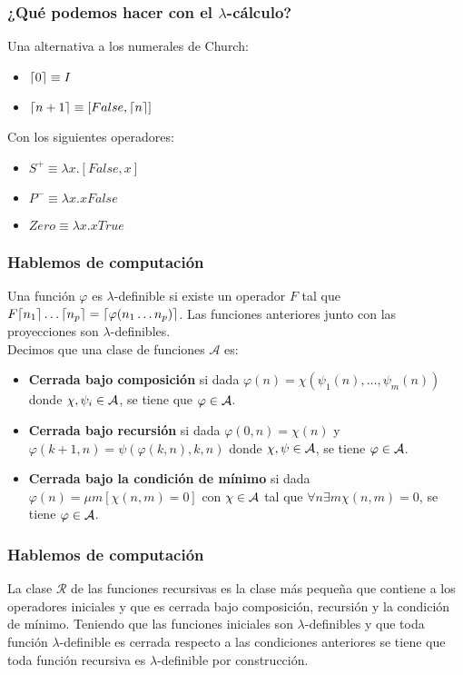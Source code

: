 \documentclass[spanish, a4paper, 12pt, final, slideColor, nototal, colorBG, pdf, noaccumulate, darkblue] {beamer}
\DeclarePairedDelimiter{\ceil}{\lceil}{\rceil}
\begin{document}
\begin{frame}
    \frametitle{¿Qué podemos hacer con el $\lambda$-cálculo?}
    Una alternativa a los numerales de Church:
    \begin{itemize}
        \item $\ceil{0} \equiv I$
        \item $\ceil{n+1} \equiv [False, \ceil{n}]$
    \end{itemize}
    Con los siguientes operadores:
    \begin{itemize}
        \item $S^{+} \equiv \lambda x.[False, x]$
        \item $P^{-} \equiv \lambda x.xFalse$
        \item $Zero \equiv \lambda x.xTrue$
    \end{itemize}
\end{frame}
\begin{frame}
    \frametitle{Hablemos de computación}
    Una función $\varphi$ es $\lambda$-definible si existe un operador $F$ tal que $F\ceil{n_1}\ldots\ceil{n_p} = \ceil{\varphi(n_1\ldots n_p)}$. Las funciones anteriores junto con las proyecciones son $\lambda$-definibles.\\
    Decimos que una clase de funciones $\mathcal{A}$ es:
    \begin{itemize}
        \item \textbf{Cerrada bajo composición} si dada $\varphi(n) = \chi(\psi_1(n),\ldots, \psi_m(n))$ donde $\chi, \psi_i \in \cal{A}$, se tiene que $\varphi \in \cal{A}$.
        \item \textbf{Cerrada bajo recursión} si dada $\varphi(0, n) = \chi(n)$ y $\varphi(k+1, n) = \psi(\varphi(k, n), k, n)$ donde $\chi, \psi \in \cal{A}$, se tiene $\varphi \in \cal{A}$.
        \item \textbf{Cerrada bajo la condición de mínimo} si dada $\varphi(n) = \mu m[\chi(n, m) = 0]$ con $\chi \in \cal{A}$ tal que $\forall n \exists m \chi(n, m) = 0$, se tiene $\varphi \in \cal{A}$.
    \end{itemize}
\end{frame}
\begin{frame}
    \frametitle{Hablemos de computación}
    La clase $\mathcal{R}$ de las funciones recursivas es la clase más pequeña que contiene a los operadores iniciales y que es cerrada bajo composición, recursión y la condición de mínimo. Teniendo que las funciones iniciales son $\lambda$-definibles y que toda función $\lambda$-definible es cerrada respecto a las condiciones anteriores se tiene que toda función recursiva es $\lambda$-definible por construcción.
\end{frame}
\end{document}
